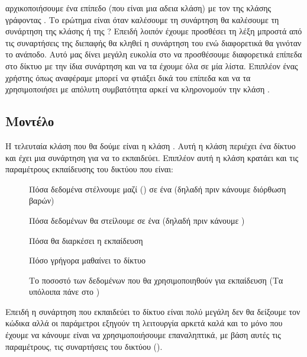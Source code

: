 αρχικοποιήσουμε ένα επίπεδο (που είναι μια αδεια κλάση) με τον  της κλάσης  γράφοντας . Το ερώτημα είναι όταν καλέσουμε τη συνάρτηση
 θα καλέσουμε τη συνάρτηση  της κλάσης  ή της ? Επειδή λοιπόν έχουμε προσθέσει τη λέξη  μπροστά από τις συναρτήσεις της διεπαφής θα
κληθεί η συνάρτηση του  ενώ διαφορετικά θα γινόταν το ανάποδο. Αυτό μας δίνει μεγάλη ευκολία στο να προσθέσουμε διαφορετικά επίπεδα στο δίκτυο με την ίδια συνάρτηση και να τα έχουμε όλα σε μία λίστα. Επιπλέον ένας χρήστης όπως
αναφέραμε μπορεί να φτιάξει δικά του επίπεδα και να τα χρησιμοποιήσει με απόλυτη συμβατότητα αρκεί να κληρονομούν την κλάση .

\subsection{Μοντέλο}
Η τελευταία κλάση που θα δούμε είναι η κλάση . Αυτή η κλάση περιέχει ένα δίκτυο και έχει μια συνάρτηση για να το εκπαιδεύει. Επιπλέον αυτή η κλάση κρατάει και τις παραμέτρους εκπαίδευσης του δικτύου που είναι:
\begin{description}
    \item[] Πόσα δεδομένα στέλνουμε μαζί () σε ένα  (δηλαδή πριν κάνουμε διόρθωση βαρών)
    \item[] Πόσα  δεδομένων θα στείλουμε σε ένα  (δηλαδή πριν κάνουμε )
    \item[] Πόσα  θα διαρκέσει η εκπαίδευση
    \item[] Πόσο γρήγορα μαθαίνει το δίκτυο
    \item[] Το ποσοστό των δεδομένων που θα χρησιμοποιηθούν για εκπαίδευση (Τα υπόλοιπα πάνε στο )
\end{description}

Επειδή η συνάρτηση που εκπαιδεύει το δίκτυο είναι πολύ μεγάλη δεν θα δείξουμε τον κώδικα αλλά οι παράμετροι εξηγούν τη λειτουργία αρκετά καλά και το μόνο που έχουμε να κάνουμε είναι να χρησιμοποιήσουμε επαναληπτικά, με βάση αυτές τις παραμέτρους, τις συναρτήσεις του δικτύου ().

